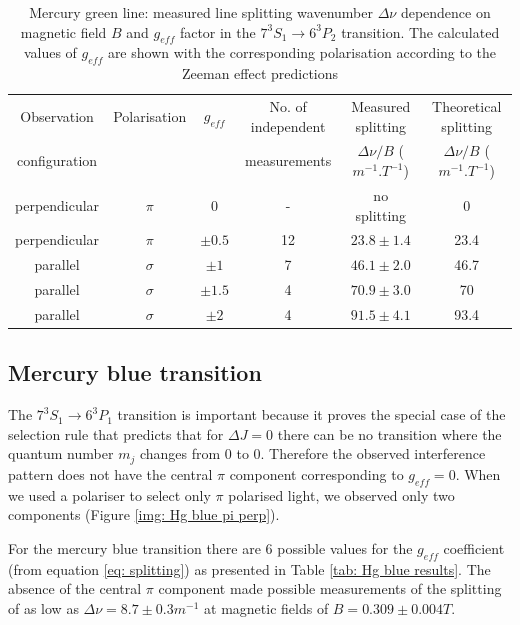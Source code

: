 \documentclass[11pt]{article}
\begin{document}
\begin{table}[h!]
    \centering
    \begin{tabular}{c|ccccc}
    \toprule
        Observation & Polarisation  & \( g_{eff} \) & No. of independent & Measured splitting  & Theoretical splitting \\
        configuration & & & measurements & $\Delta \nu / B$ ($\si{m^{-1}.T^{-1}}$) & $\Delta \nu / B$ ($\si{m^{-1}.T^{-1}}$) \\
    \midrule
        perpendicular & \( \pi \) & 0 & - & no splitting & 0\\
        perpendicular & \( \pi \) & $\pm 0.5$ & 12 & $23.8 \pm 1.4$ & 23.4\\
        parallel & \( \sigma \) & $\pm 1$ & 7 & $46.1 \pm 2.0$ & 46.7\\
        parallel & \( \sigma \) & $\pm 1.5$ & 4 & $70.9 \pm 3.0$ & 70\\
        parallel & \( \sigma \) & $\pm 2$ & 4 & $91.5 \pm 4.1$ & 93.4\\
    \bottomrule
  \end{tabular}
    \captionsetup{justification=centering}
  \caption{Mercury green line: measured line splitting wavenumber $\Delta \nu$ dependence on magnetic field $B$ and $g_{eff}$ factor in the $7^3 S_1\rightarrow 6^3 P_2$ transition. The calculated values of \(g_{eff}\) are shown with the corresponding polarisation according to the Zeeman effect predictions}
  \label{tab: Hg green results}
\end{table}

\subsection{Mercury blue transition} \label{sec: Hg blue}
The $7^3 S_1 \rightarrow 6^3 P_1$ transition is important because it proves the special case of the selection rule that predicts that for $\Delta J = 0$ there can be no transition where the quantum number $m_j$ changes from 0 to 0. Therefore the observed interference pattern does not have the central $\pi$ component corresponding to $g_{eff} = 0$. When we used a polariser to select only $\pi$ polarised light, we observed only two components (Figure \ref{img: Hg blue pi perp}). 

For the mercury blue transition there are 6 possible values for the $g_{eff}$ coefficient (from equation \eqref{eq: splitting}) as presented in Table \ref{tab: Hg blue results}. The absence of the central $\pi$ component made possible measurements of the splitting of as low as $\Delta \nu = 8.7 \pm 0.3 \si{m^{-1}}$ at magnetic fields of $B = 0.309 \pm 0.004 \si{T}$. 
\end{document}
